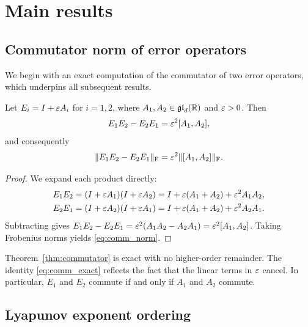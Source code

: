 \section{Main results}\label{sec:results}

\subsection{Commutator norm of error operators}

We begin with an exact computation of the commutator of two error
operators, which underpins all subsequent results.

\begin{theorem}\label{thm:commutator}
Let $E_i = I + \varepsilon A_i$ for $i = 1, 2$, where $A_1, A_2 \in \operatorname{\mathfrak{gl}}_d(\mathbb{R})$
and $\varepsilon > 0$.  Then
\begin{equation}\label{eq:comm_exact}
  E_1 E_2 - E_2 E_1 = \varepsilon^2 [A_1, A_2],
\end{equation}
and consequently
\begin{equation}\label{eq:comm_norm}
  \lVert E_1 E_2 - E_2 E_1 \rVert_{\mathrm{F}} = \varepsilon^2 \lVert [A_1, A_2] \rVert_{\mathrm{F}}.
\end{equation}
\end{theorem}

\begin{proof}
We expand each product directly:
\begin{align*}
  E_1 E_2 &= (I + \varepsilon A_1)(I + \varepsilon A_2)
           = I + \varepsilon(A_1 + A_2) + \varepsilon^2 A_1 A_2, \\
  E_2 E_1 &= (I + \varepsilon A_2)(I + \varepsilon A_1)
           = I + \varepsilon(A_1 + A_2) + \varepsilon^2 A_2 A_1.
\end{align*}
Subtracting gives
$E_1 E_2 - E_2 E_1 = \varepsilon^2(A_1 A_2 - A_2 A_1) = \varepsilon^2 [A_1, A_2]$.
Taking Frobenius norms yields \eqref{eq:comm_norm}.
\end{proof}

\begin{remark}\label{rem:commutator}
Theorem~\ref{thm:commutator} is exact with no higher-order remainder.
The identity \eqref{eq:comm_exact} reflects the fact that the linear
terms in $\varepsilon$ cancel.  In particular, $E_1$ and $E_2$ commute if
and only if $A_1$ and $A_2$ commute.
\end{remark}

\subsection{Lyapunov exponent ordering}

